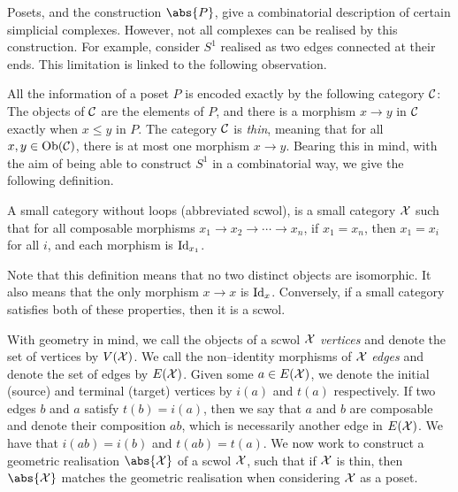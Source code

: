 Posets, and the construction $\abs{P}$, give a combinatorial description of certain simplicial complexes.
However, not all complexes can be realised by this construction.
For example, consider $S^1$ realised as two edges connected at their ends.
This limitation is linked to the following observation.

All the information of a poset $P$ is encoded exactly by the following category $\mathcal{C}$:
The objects of  $\mathcal{C}$ are the elements of  $P$, and there is a morphism  $x \to y$ in  $\mathcal{C}$ exactly when  $x \leq y$ in $P$.
The category $\mathcal{C}$ is \emph{thin}, meaning that for all  $x,y \in \operatorname{Ob}(\mathcal{C})$, there is at most one morphism  $x \to y$.
Bearing this in mind, with the aim of being able to construct $S^1$ in a combinatorial way, we give the following definition.

\begin{definition}
	A small category without loops (abbreviated scwol), is a small category $\mathcal{X}$ such that for all composable morphisms $x_1 \to x_2 \to \cdots \to x_n$, if $x_1=x_n$, then $x_1=x_i$ for all $i$, and each morphism is $\operatorname{Id}_{x_1}$.
	\label{def:scwol}
\end{definition}


Note that this definition means that no two distinct objects are isomorphic.
It also means that the only morphism $x \to x$ is $\operatorname{Id}_x$.
Conversely, if a small category satisfies both of these properties, then it is a scwol.

With geometry in mind, we call the objects of a scwol $\mathcal{X}$ \emph{vertices} and denote the set of vertices by $V(\mathcal{X})$.
We call the non--identity morphisms of  $\mathcal{X}$ \emph{edges} and denote the set of edges by $E(\mathcal{X})$.
Given some $a \in E(\mathcal{X})$, we denote the initial (source) and terminal (target) vertices by $i(a)$ and $t(a)$ respectively.
If two edges $b$ and $a$ satisfy $t(b)=i(a)$, then we say that $a$ and $b$ are composable and denote their composition $ab$, which is necessarily another edge in $E(\mathcal{X})$.
We have that $i(ab) = i(b)$ and $t(ab) = t(a)$.
We now work to construct a geometric realisation $\abs{\calx}$ of a scwol $\mathcal{X}$, such that if $\mathcal{X}$ is thin, then $\abs{\calx}$ matches the geometric realisation when considering $\mathcal{X}$ as a poset.

